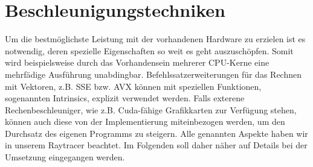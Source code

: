 \section{Beschleunigungstechniken}
Um die bestmöglichste Leistung mit der vorhandenen Hardware zu erzielen ist es notwendig, deren spezielle Eigenschaften so weit es geht auszuschöpfen.
Somit wird beispielsweise durch das Vorhandensein mehrerer CPU-Kerne eine mehrfädige Ausführung unabdingbar.
Befehlssatzerweiterungen für das Rechnen mit Vektoren, z.B. SSE bzw. AVX können mit speziellen Funktionen, sogenannten Intrinsics, explizit verwendet werden.
Falls exterene Rechenbeschleuniger, wie z.B. Cuda-fähige Grafikkarten zur Verfügung stehen, können auch diese von der Implementierung miteinbezogen werden, um den Durchsatz des eigenen Programms zu steigern.
Alle genannten Aspekte haben wir in unserem Raytracer beachtet.
Im Folgenden soll daher näher auf Details bei der Umsetzung eingegangen werden.
